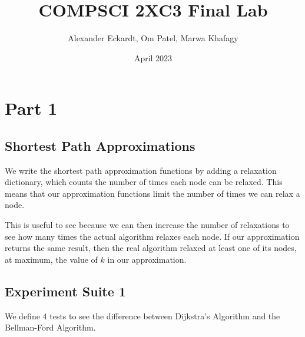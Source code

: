 \documentclass{article}
\title{COMPSCI 2XC3 Final Lab}
\author{Alexander Eckardt, Om Patel, Marwa Khafagy}
\date{April 2023}
\begin{document}
\maketitle
\newpage

\tableofcontents
\newpage

\listoffigures
\newpage


\section{Part 1}


\subsection{Shortest Path Approximations}

We write the shortest path approximation functions by adding a relaxation dictionary, which counts the number of times each node can be relaxed. This means that our approximation functions limit the number of times we can relax a node.

This is useful to see because we can then increase the number of relaxations to see how many times the actual algorithm relaxes each node. If our approximation returns the same result, then the real algorithm relaxed at least one of its nodes, at maximum, the value of $k$ in our approximation.


\subsection{Experiment Suite 1}

We define 4 tests to see the difference between Dijkstra's Algorithm and the Bellman-Ford Algorithm.
\end{document}
